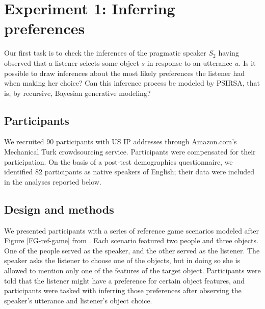 \documentclass[10pt,a4paper]{article}
\begin{document}
\section{Experiment 1: Inferring preferences}

Our first task is to check the inferences of the pragmatic speaker $S_2$ having observed that a listener selects some object $s$ in response to an utterance $u$. 
Is it possible to draw inferences about the most likely preferences the listener had when making her choice? 
Can this inference process be modeled by PSIRSA, that is, by recursive, Bayesian generative modeling?


\subsection{Participants}

We recruited 90 participants with US IP addresses through Amazon.com's Mechanical Turk crowdsourcing service. Participants were compensated for their participation. On the basis of a post-test demographics questionnaire, we identified 82 participants as native speakers of English; their data were included in the analyses reported below.

\subsection{Design and methods}

We presented participants with a series of reference game scenarios modeled after Figure \ref{FG-ref-game} from . Each scenario featured two people and three objects. One of the people served as the speaker, and the other served as the listener. The speaker asks the listener to choose one of the objects, but in doing so she is allowed to mention only one of the features of the target object. Participants were told that the listener might have a preference for certain object features, and participants were tasked with inferring those preferences after observing the speaker's utterance and listener's object choice.
\end{document}
